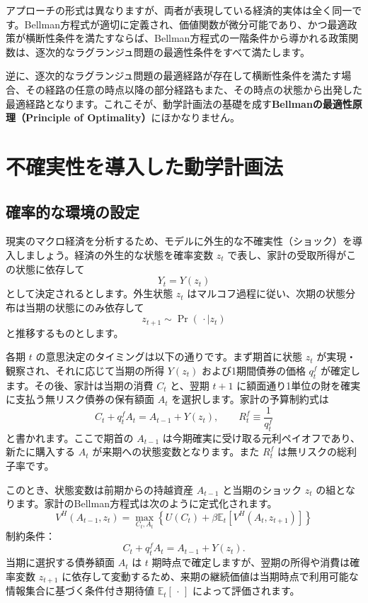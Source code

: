 \documentclass[
  japanese,
  lualatex,
  ja=standard,
  12pt,
  a4paper]{ltjsarticle}
\begin{document}
アプローチの形式は異なりますが、両者が表現している経済的実体は全く同一です。Bellman方程式が適切に定義され、価値関数が微分可能であり、かつ最適政策が横断性条件を満たすならば、Bellman方程式の一階条件から導かれる政策関数は、逐次的なラグランジュ問題の最適性条件をすべて満たします。

逆に、逐次的なラグランジュ問題の最適経路が存在して横断性条件を満たす場合、その経路の任意の時点以降の部分経路もまた、その時点の状態から出発した最適経路となります。これこそが、動学計画法の基礎を成す\textbf{Bellmanの最適性原理（Principle
of Optimality）}にほかなりません。

\section{不確実性を導入した動学計画法}\label{ux4e0dux78baux5b9fux6027ux3092ux5c0eux5165ux3057ux305fux52d5ux5b66ux8a08ux753bux6cd5}

\subsection{確率的な環境の設定}\label{ux78baux7387ux7684ux306aux74b0ux5883ux306eux8a2dux5b9a}

現実のマクロ経済を分析するため、モデルに外生的な不確実性（ショック）を導入しましょう。経済の外生的な状態を確率変数
\(z_t\) で表し、家計の受取所得がこの状態に依存して \[
Y_t = Y(z_t)
\] として決定されるとします。外生状態 \(z_t\)
はマルコフ過程に従い、次期の状態分布は当期の状態にのみ依存して \[
z_{t+1} \sim \Pr(\,\cdot \mid z_t)
\] と推移するものとします。

各期 \(t\) の意思決定のタイミングは以下の通りです。まず期首に状態
\(z_t\) が実現・観察され、それに応じて当期の所得 \(Y(z_t)\)
および1期間債券の価格 \(q_t^f\) が確定します。その後、家計は当期の消費
\(C_t\) と、翌期 \(t+1\)
に額面通り1単位の財を確実に支払う無リスク債券の保有額面 \(A_t\)
を選択します。家計の予算制約式は \[
C_t + q_t^f A_t = A_{t-1} + Y(z_t), \qquad R_t^f \equiv \frac{1}{q_t^f}
\] と書かれます。ここで期首の \(A_{t-1}\)
は今期確実に受け取る元利ペイオフであり、新たに購入する \(A_t\)
が来期への状態変数となります。また \(R_t^f\) は無リスクの総利子率です。

このとき、状態変数は前期からの持越資産 \(A_{t-1}\) と当期のショック
\(z_t\) の組となります。家計のBellman方程式は次のように定式化されます。
\[
V^H(A_{t-1}, z_t) = \max_{C_t, A_t} \left\{ U(C_t) + \beta \mathbb{E}_t \left[ V^H(A_t, z_{t+1}) \right] \right\}
\] 制約条件： \[
C_t + q_t^f A_t = A_{t-1} + Y(z_t).
\] 当期に選択する債券額面 \(A_t\) は \(t\)
期時点で確定しますが、翌期の所得や消費は確率変数 \(z_{t+1}\)
に依存して変動するため、来期の継続価値は当期時点で利用可能な情報集合に基づく条件付き期待値
\(\mathbb{E}_t[\,\cdot\,]\) によって評価されます。
\end{document}
